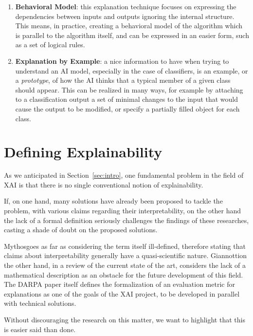 \documentclass[conference]{IEEEtran}
\newcommand{\cit}[1][]{\todo[tickmarkheight=0.2cm]{cit #1}}
\begin{document}
\begin{enumerate}
    \item \textbf{Behavioral Model}: this explanation technique focuses on expressing the dependencies
          between inputs and outputs ignoring the internal structure. This means, in
          practice, creating a behavioral model of the algorithm which is
          parallel to the algorithm itself, and can be expressed in an easier form, such as a set of logical rules.
    \item \textbf{Explanation by Example}: a nice information to have when
          trying to understand an AI model, especially in the case of
          classifiers, is an example, or a \textit{prototype}, of how the AI
          thinks that a typical member of a given class should appear. This can
          be realized in many ways, for example by attaching to a classification
          output a set of minimal changes to the input that would cause the
          output to be modified, or specify a partially filled object for each
          class.
\end{enumerate}

\section{Defining Explainability}
\label{sec:explainability}

As we anticipated in Section~\ref{sec:intro}, one fundamental problem in
the field of XAI is that there is no single conventional notion of
explainability.

If, on one hand, many solutions have already been proposed to tackle the
problem, with various claims regarding their interpretability, on the other hand
the lack of a formal definition seriously challenges the findings of these
researches, casting a shade of doubt on the proposed solutions.

Mythos\cit goes as far as considering the term itself ill-defined, therefore
stating that claims about interpretability generally have a quasi-scientific
nature. Giannotti\cit on the other hand, in a review of the current state of the
art, considers the lack of a mathematical description as an obstacle for the
future development of this field. The DARPA paper \cit itself defines the
formalization of an evaluation metric for explanations as one of the goals of
the XAI project, to be developed in parallel with technical solutions.

Without discouraging the research on this matter, we want to highlight that this
is easier said than done.
\end{document}
